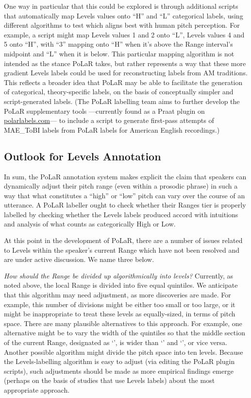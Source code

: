 \documentclass[11pt, twoside]{memoir}
\def\textlabel#1{{\relsize{-.5}\fontspec[Mapping=tex-text]{Roboto Mono}{#1}}}
\begin{document}
One way in particular that this could be explored is through additional scripts that automatically map Levels values onto “H” and “L” categorical labels, using different algorithms to test which aligns best with human pitch perception. For example, a script might map Levels values 1 and 2 onto “L”, Levels values 4 and 5 onto “H”, with “3” mapping onto “H” when it’s above the Range interval’s midpoint and “L” when it is below. This particular mapping algorithm is not intended as the stance PoLaR takes, but rather represents a way that these more gradient Levels labels could be used for reconstructing labels from AM traditions. This reflects a broader idea that PoLaR may be able to facilitate the generation of categorical, theory-specific labels, on the basis of conceptually simpler and script-generated labels. (The PoLaR labelling team aims to further develop the PoLaR supplementary tools —currently found as a Praat plugin on \href{https://www.polarlabels.com}{polarlabels.com}— to include a script to generate first-pass attempts of MAE\_ToBI labels from PoLaR labels for American English recordings.)


\subsection{Outlook for Levels Annotation}\label{sec:outlook-for-levels-annotation}
In sum, the PoLaR annotation system makes explicit the claim that speakers can dynamically adjust their pitch range (even within a prosodic phrase) in such a way that what constitutes a “high” or “low” pitch can vary over the course of an utterance. A PoLaR labeller ought to check whether their Ranges tier is properly labelled by checking whether the Levels labels produced accord with intuitions and analysis of what counts as categorically High or Low. 

At this point in the development of PoLaR, there are a number of issues related to Levels within the speaker’s current Range which have not been resolved and are under active discussion.  We name three below.

\textit{How should the Range be divided up algorithmically into levels?} Currently, as noted above, the local Range is divided into five equal quintiles. We anticipate that this algorithm may need adjustment, as more discoveries are made. For example, this number of divisions might be either too small or too large, or it might be inappropriate to treat these levels as equally-sized, in terms of pitch space. There are many plausible alternatives to this approach. For example, one alternative might be to vary the width of the quintiles so that the middle section of the current Range, designated as ‘\textlabel{3}’, is wider than ‘\textlabel{1}’ and ‘\textlabel{5}’, or vice versa. Another possible algorithm might divide the pitch space into ten levels. Because the Levels-labelling algorithm is easy to adjust (via editing the PoLaR plugin scripts), such adjustments should be made as more empirical findings emerge (perhaps on the basis of studies that use Levels labels) about the most appropriate approach.
\end{document}
